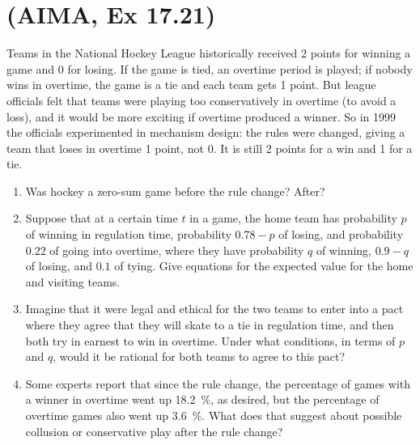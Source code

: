 \documentclass[11pt, a4paper]{article}
\begin{document}
\newpage

\section{(AIMA, Ex 17.21)}

Teams in the National Hockey League historically received 2 points for winning a game and 0 for losing. If the game is tied, an overtime period is played; if nobody wins in overtime, the game is a tie and each team gets 1 point. But league officials felt that teams were playing too conservatively in overtime (to avoid a loss), and it would be more exciting if overtime produced a winner. So in 1999 the officials experimented in mechanism design: the rules were changed, giving a team that loses in overtime 1 point, not 0. It is still 2 points for a win and 1 for a tie.

\begin{enumerate}
    \item Was hockey a zero-sum game before the rule change? After?

    \item Suppose that at a certain time $t$ in a game, the home team has probability $p$ of winning in regulation time, probability $0.78 - p$ of losing, and probability $0.22$ of going into overtime, where they have probability $q$ of winning, $0.9 - q$ of losing, and $0.1$ of tying. Give equations for the expected value for the home and visiting teams.

    \item Imagine that it were legal and ethical for the two teams to enter into a pact where they agree that they will skate to a tie in regulation time, and then both try in earnest to win in overtime. Under what conditions, in terms of $p$ and $q$, would it be rational for both teams to agree to this pact?

    \item Some experts report that since the rule change, the percentage of games with a winner in overtime went up \qty{18.2}{\percent}, as desired, but the percentage of overtime games also went up \qty{3.6}{\percent}. What does that suggest about possible collusion or conservative play after the rule change?
\end{enumerate}

\newpage
\end{document}
